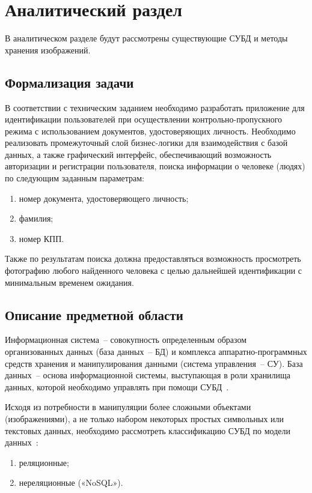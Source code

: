 \chapter{Аналитический раздел}

В аналитическом разделе будут рассмотрены существующие СУБД и методы хранения изображений.

\section{Формализация задачи}

В соответствии с техническим заданием необходимо разработать приложение для идентификации пользователей при осуществлении контрольно-пропускного режима с использованием документов, удостоверяющих личность.
Необходимо реализовать промежуточный слой бизнес-логики для взаимодействия с базой данных, а также графический интерфейс, обеспечивающий возможность авторизации и регистрации пользователя, поиска информации о человеке (людях) по следующим заданным параметрам:
\begin{enumerate}
	\item номер документа, удостоверяющего личность;
	\item фамилия;
	\item номер КПП.
\end{enumerate}
Также по результатам поиска должна предоставляться возможность просмотреть фотографию любого найденного человека с целью дальнейшей идентификации с минимальным временем ожидания.

\section{Описание предметной области}

Информационная система~-- совокупность определенным образом организованных данных (база данных~-- БД) и комплекса аппаратно-программных средств хранения и манипулирования данными (система управления~-- СУ).
База данных~-- основа информационной системы, выступающая в роли хранилища данных, которой необходимо управлять при помощи СУБД~\cite{baseDB}.

Исходя из потребности в манипуляции более сложными объектами (изображениями), а не только набором некоторых простых символьных или текстовых данных, необходимо рассмотреть классификацию СУБД по модели данных~\cite{highloadApps}:
\begin{enumerate}
	\item реляционные;
	\item нереляционные («NoSQL»).
\end{enumerate}

